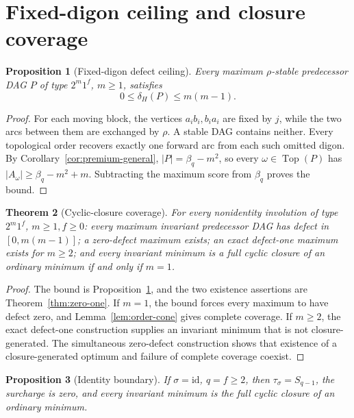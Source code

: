 \documentclass[11pt,a4paper]{article}
\newtheorem{theorem}{Theorem}[section]
\newtheorem{proposition}[theorem]{Proposition}
\theoremstyle{remark}
\newcommand{\Top}{\operatorname{Top}}
\begin{document}
\section{Fixed-digon ceiling and closure coverage}
\label{sec:coverage}

\begin{proposition}[Fixed-digon defect ceiling]
\label{prop:ceiling}
Every maximum \(\rho\)-stable predecessor DAG \(P\) of type \(2^m1^f\),
\(m\geq1\), satisfies
\[
 0\leq\delta_H(P)\leq m(m-1).
\]
\end{proposition}

\begin{proof}
For each moving block, the vertices \(a_ib_i,b_ia_i\) are fixed by \(j\),
while the two arcs between them are exchanged by \(\rho\).  A stable DAG
contains neither.  Every topological order recovers exactly one forward arc
from each such omitted digon.  By Corollary~\ref{cor:premium-general},
\(|P|=\beta_q-m^2\), so every \(\omega\in\Top(P)\) has
\(|A_\omega|\geq\beta_q-m^2+m\).  Subtracting the maximum score from
\(\beta_q\) proves the bound.
\end{proof}

\begin{theorem}[Cyclic-closure coverage]
\label{thm:coverage}
For every nonidentity involution of type \(2^m1^f\), \(m\geq1,f\geq0\):
every maximum invariant predecessor DAG has defect in
\([0,m(m-1)]\); a zero-defect maximum exists; an exact defect-one maximum
exists for \(m\geq2\); and every invariant minimum is a full cyclic closure
of an ordinary minimum if and only if \(m=1\).
\end{theorem}

\begin{proof}
The bound is Proposition~\ref{prop:ceiling}, and the two existence assertions
are Theorem~\ref{thm:zero-one}.  If \(m=1\), the bound forces every maximum
to have defect zero, and Lemma~\ref{lem:order-cone} gives complete coverage.
If \(m\geq2\), the exact defect-one construction supplies an invariant
minimum that is not closure-generated.  The simultaneous zero-defect
construction shows that existence of a closure-generated optimum and failure
of complete coverage coexist.
\end{proof}

\begin{proposition}[Identity boundary]
\label{prop:identity}
If \(\sigma=\mathrm{id}\), \(q=f\geq2\), then
\(\tau_\sigma=S_{q-1}\), the surcharge is zero, and every invariant minimum
is the full cyclic closure of an ordinary minimum.
\end{proposition}
\end{document}
